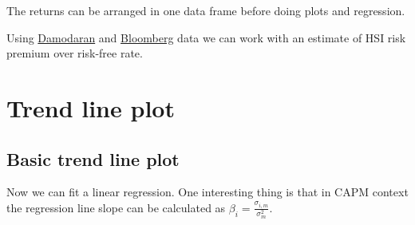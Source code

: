 The returns can be arranged in one data frame before doing plots and
regression.

\begin{Shaded}
\begin{Highlighting}[]
\StringTok{ }\NormalTok{)}
\StringTok{ }
\StringTok{ }\NormalTok{(}\NormalTok{,}\NormalTok{,}\NormalTok{)}
\end{Highlighting}
\end{Shaded}

Using
\href{http://pages.stern.nyu.edu/~adamodar/New_Home_Page/datafile/ctryprem.html}{Damodaran}
and
\href{http://www.bloomberg.com/markets/rates-bonds/government-bonds/us}{Bloomberg}
data we can work with an estimate of HSI risk premium over risk-free
rate.

\begin{Shaded}
\begin{Highlighting}[]
\StringTok{ }\NormalTok{/}
\StringTok{ }\NormalTok{/}
\end{Highlighting}
\end{Shaded}

\section{Trend line plot}\label{trend-line-plot}

\subsection{Basic trend line plot}\label{basic-trend-line-plot}

Now we can fit a linear regression. One interesting thing is that in
CAPM context the regression line slope can be calculated as
\(\beta_i = \displaystyle \frac{\sigma_{i,m}}{\sigma_m^2}\).

